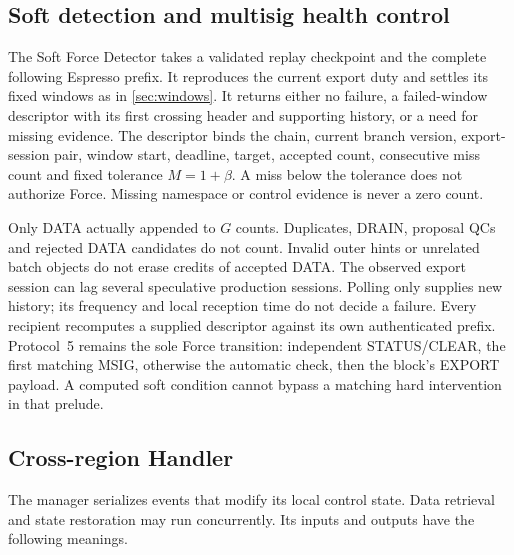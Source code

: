 \documentclass[11pt,a4paper]{article}
\begin{document}
\subsection{Soft detection and multisig health control}
\label{sec:runtime-controls}
The Soft Force Detector takes a validated replay checkpoint and the
complete following Espresso prefix. It reproduces the current export
duty and settles its fixed windows as in \cref{sec:windows}. It returns
either no failure, a failed-window descriptor with its first crossing
header and supporting history, or a need for missing evidence. The
descriptor binds the chain, current branch version, export-session pair,
window start, deadline, target, accepted count, consecutive miss count
and fixed tolerance $M=1+\beta$. A miss below the tolerance does not
authorize Force. Missing namespace or control evidence is never a zero count.

Only DATA actually appended to $G$ counts. Duplicates, DRAIN, proposal
QCs and rejected DATA candidates do not count. Invalid outer hints or
unrelated batch objects do not erase credits of accepted DATA. The observed export session can
lag several speculative production sessions. Polling only supplies new
history; its frequency and local reception time do not decide a failure.
Every recipient recomputes a supplied descriptor against its own
authenticated prefix. Protocol~5 remains the sole Force transition:
independent STATUS/CLEAR, the first matching MSIG, otherwise the
automatic check, then the block's EXPORT payload. A computed soft
condition cannot bypass a matching hard intervention in that prelude.



\subsection{Cross-region Handler}
\label{sec:session-manager}
The manager serializes events that modify its local control state.
Data retrieval and state restoration may run concurrently. Its
inputs and outputs have the following meanings.
\end{document}
